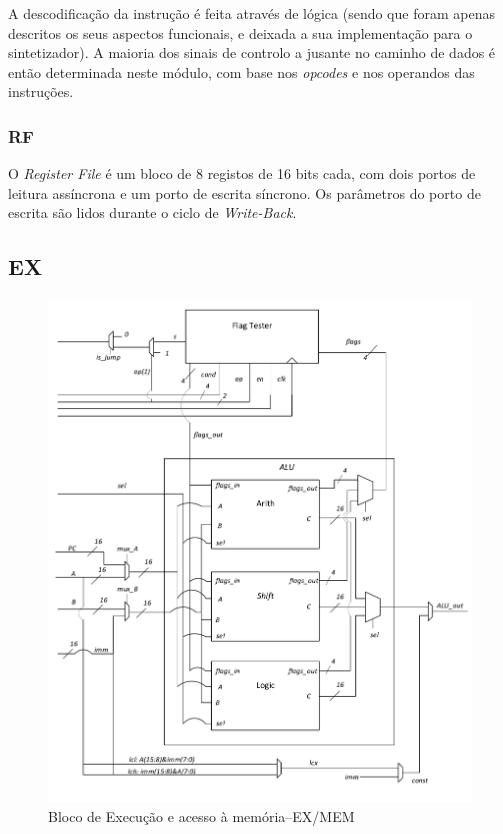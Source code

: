 \documentclass[a4paper]{article}
\begin{document}
			A descodificação da instrução é feita através de lógica (sendo que foram apenas descritos os seus aspectos funcionais, e deixada a sua implementação para o sintetizador). A maioria dos sinais de controlo a jusante no caminho de dados é então determinada neste módulo, com base nos \textit{opcodes} e nos operandos das instruções.
			
			\subsubsection{RF}
			
			O \textit{Register File} é um bloco de 8 registos de 16 bits cada, com dois portos de leitura assíncrona e um porto de escrita síncrono. Os parâmetros do porto de escrita são lidos durante o ciclo de \textit{Write-Back}.
			
		\subsection{EX}
		
			\begin{figure}[H]
				\centering
				\centerline{
					\includegraphics[width=.8\paperwidth]{img/EX}
				}
				\caption{Bloco de Execução e acesso à memória--EX/MEM}
				\label{fig:ex}
			\end{figure}
		
\end{document}
